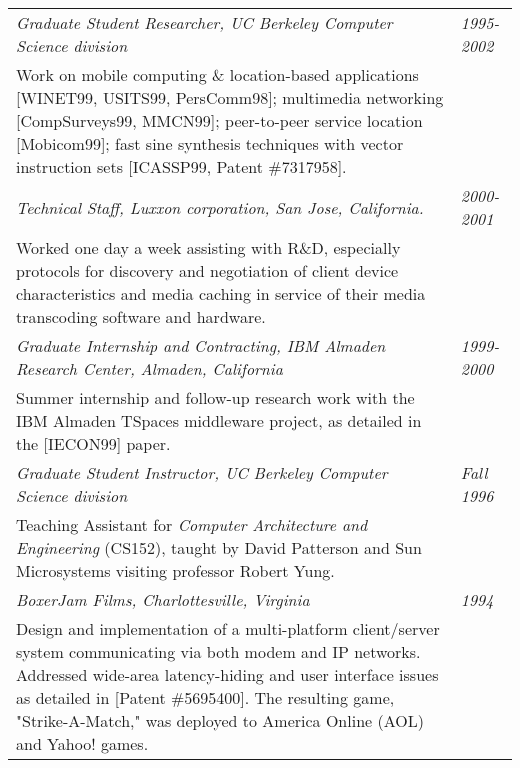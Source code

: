\begin{tabular}{p{5.2in}@{\hspace{1.5cm}}l}
	  
    \em Graduate Student Researcher, UC Berkeley Computer Science division
                                                                 & \em 1995-2002 \\[3pt]
       Work on mobile computing \& location-based applications 
       [WINET99, USITS99, PersComm98]; 
       multimedia networking [CompSurveys99, MMCN99];
       peer-to-peer service location [Mobicom99];
       fast sine synthesis techniques with vector instruction 
       sets [ICASSP99, Patent \#7317958]. \\[9pt]
       	  

    \em Technical Staff, Luxxon corporation, San Jose, California. &\em  2000-2001 \\[3pt]
       Worked one day a week assisting with R\&D, especially
       protocols for discovery and negotiation of client
       device characteristics and media caching in service of their media transcoding
       software and hardware. \\[9pt]

    \em Graduate Internship and Contracting, IBM Almaden Research Center, 
          Almaden, California                         & \em 1999-2000 \\[3pt]
       Summer internship and follow-up research work with
       the IBM Almaden TSpaces middleware project, as detailed in the [IECON99] paper. \\[9pt]


    \em Graduate Student Instructor, UC Berkeley Computer Science division
                                                                 & \em Fall 1996 \\[3pt]
       Teaching Assistant for {\em Computer Architecture and
       Engineering} (CS152), taught by David Patterson and
       Sun Microsystems visiting professor Robert Yung. \\[9pt]



    \em BoxerJam Films, Charlottesville, Virginia                & \em 1994 \\[3pt]
       Design and implementation of a multi-platform
       client/server system communicating via both modem and IP
       networks.  Addressed wide-area latency-hiding and user interface
       issues as detailed in [Patent \#5695400].  The resulting game, "Strike-A-Match,"
       was deployed to America Online (AOL) and Yahoo! games.
       \\[9pt]



\end{tabular}
